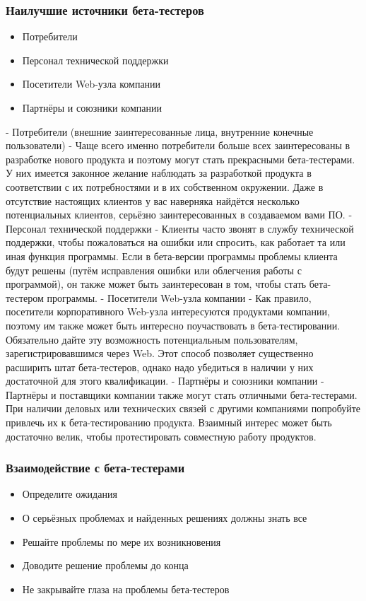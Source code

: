 \documentclass{../industrial-development}
\begin{document}
\begin{frame} \frametitle{Наилучшие источники бета-тестеров}
	\begin{itemize}
		\item Потребители
		\item Персонал технической поддержки
		\item Посетители Web-узла компании
		\item Партнёры и союзники компании
	\end{itemize}
\end{frame}
\lecturenotes
- Потребители (внешние заинтересованные лица, внутренние конечные пользователи) - Чаще всего именно потребители больше всех заинтересованы в разработке нового продукта и поэтому могут стать прекрасными бета-тестерами. У них имеется законное желание наблюдать за разработкой продукта в соответствии с их потребностями и в их собственном окружении. Даже в отсутствие настоящих клиентов у вас наверняка найдётся несколько потенциальных клиентов, серьёзно заинтересованных в создаваемом вами ПО.
- Персонал технической поддержки - Клиенты часто звонят в службу технической поддержки, чтобы пожаловаться на ошибки или спросить, как работает та или иная функция программы. Если в бета-версии программы проблемы клиента будут решены (путём исправления ошибки или облегчения работы с программой), он также может быть заинтересован в том, чтобы стать бета-тестером программы.
- Посетители Web-узла компании - Как правило, посетители корпоративного Web-узла интересуются продуктами компании, поэтому им также может быть интересно поучаствовать в бета-тестировании. Обязательно дайте эту возможность потенциальным пользователям, зарегистрировавшимся через Web. Этот способ позволяет существенно расширить штат бета-тестеров, однако надо убедиться в наличии у них достаточной для этого квалификации.
- Партнёры и союзники компании - Партнёры и поставщики компании также могут стать отличными бета-тестерами. При наличии деловых или технических связей с другими компаниями попробуйте привлечь их к бета-тестированию продукта. Взаимный интерес может быть достаточно велик, чтобы протестировать совместную работу продуктов.

\begin{frame} \frametitle{Взаимодействие с бета-тестерами}
	\begin{itemize}
		\item Определите ожидания
		\item О серьёзных проблемах и найденных решениях должны знать все
		\item Решайте проблемы по мере их возникновения
		\item Доводите решение проблемы до конца
		\item Не закрывайте глаза на проблемы бета-тестеров
	\end{itemize}
\end{frame}
\end{document}
